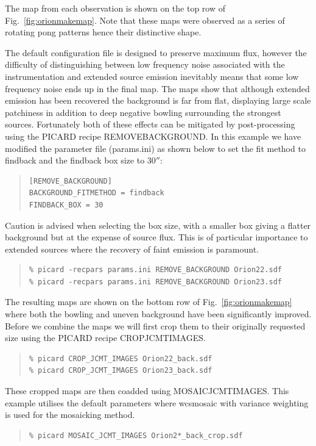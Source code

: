 \documentclass[twoside,11pt]{article}
\renewcommand{\_}{\texttt{\symbol{95}}}
\newenvironment{myquote}{\begin{quote}\begin{small}}{\end{small}\end{quote}}
\begin{document}
The map from each observation is shown on the top row of Fig.~\ref{fig:orionmakemap}. Note that these maps were observed as a series of rotating pong patterns hence their distinctive shape.

The default configuration file is designed to preserve maximum flux, however the difficulty of distinguishing between low frequency noise associated with the instrumentation and extended source emission inevitably means that some low frequency noise ends up in the final map. The maps  show that although extended emission has been recovered the background is far from flat, displaying large scale patchiness in addition to deep negative bowling surrounding the strongest sources. Fortunately both of these effects can be mitigated by post-processing using the PICARD recipe REMOVE\_BACKGROUND. In this example we have modified the parameter file (params.ini) as shown below to set the fit method to findback and the findback box size to 30$''$:
\begin{myquote}
\begin{verbatim}
[REMOVE_BACKGROUND]
BACKGROUND_FITMETHOD = findback
FINDBACK_BOX = 30
\end{verbatim}
\end{myquote}
Caution is advised when selecting the box size, with a smaller box giving a flatter background but at the expense of source flux. This is of particular importance to extended sources where the recovery of faint emission is paramount.

\begin{myquote}
\begin{verbatim}
% picard -recpars params.ini REMOVE_BACKGROUND Orion22.sdf
% picard -recpars params.ini REMOVE_BACKGROUND Orion23.sdf
\end{verbatim}
\end{myquote}
The resulting maps are shown on the bottom row of Fig.~\ref{fig:orionmakemap} where both the bowling and uneven background have been significantly improved. Before we combine the maps we will first crop them to their originally requested size using the PICARD recipe CROP\_JCMT\_IMAGES. 
\begin{myquote}
\begin{verbatim}
% picard CROP_JCMT_IMAGES Orion22_back.sdf
% picard CROP_JCMT_IMAGES Orion23_back.sdf
\end{verbatim}
\end{myquote}

These cropped maps are then coadded using MOSAIC\_JCMT\_IMAGES. This example utilises the default parameters where wcsmosaic with variance weighting is used for the mosaicking method.
\begin{myquote}
\begin{verbatim}
% picard MOSAIC_JCMT_IMAGES Orion2*_back_crop.sdf
\end{verbatim}
\end{myquote}
\end{document}

